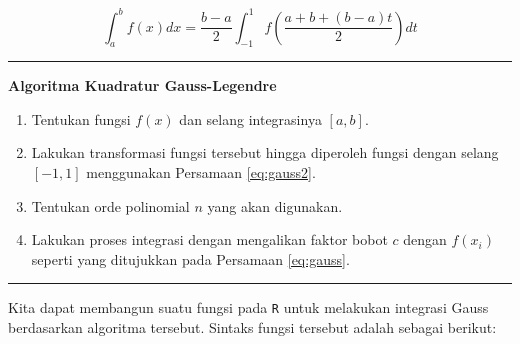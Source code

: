 \documentclass[]{book}
\providecommand{\tightlist}{%
  \setlength{\itemsep}{0pt}\setlength{\parskip}{0pt}}
\theoremstyle{definition}
\theoremstyle{definition}
\theoremstyle{definition}
\theoremstyle{remark}
\begin{document}
\begin{equation}
\int_a^bf\left(x\right)dx=\frac{b-a}{2}\int_{-1}^1f\left(\frac{a+b+\left(b-a\right)t}{2}\right)dt
  \label{eq:gauss2}
\end{equation}

\begin{center}\rule{0.5\linewidth}{\linethickness}\end{center}

\textbf{Algoritma Kuadratur Gauss-Legendre}

\begin{enumerate}
\def\labelenumi{\arabic{enumi}.}
\tightlist
\item
  Tentukan fungsi \(f\left(x\right)\) dan selang integrasinya \(\left[a,b\right]\).
\item
  Lakukan transformasi fungsi tersebut hingga diperoleh fungsi dengan selang \(\left[-1,1\right]\) menggunakan Persamaan \eqref{eq:gauss2}.
\item
  Tentukan orde polinomial \(n\) yang akan digunakan.
\item
  Lakukan proses integrasi dengan mengalikan faktor bobot \(c\) dengan \(f\left(x_i\right)\) seperti yang ditujukkan pada Persamaan \eqref{eq:gauss}.
\end{enumerate}

\begin{center}\rule{0.5\linewidth}{\linethickness}\end{center}

Kita dapat membangun suatu fungsi pada \texttt{R} untuk melakukan integrasi Gauss berdasarkan algoritma tersebut. Sintaks fungsi tersebut adalah sebagai berikut:
\end{document}
